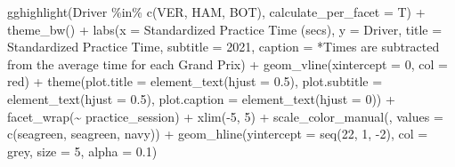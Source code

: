 \documentclass[
]{book}
\newenvironment{Shaded}{\begin{snugshade}}{\end{snugshade}}
\newcommand{\AttributeTok}[1]{\textcolor[rgb]{0.77,0.63,0.00}{#1}}
\newcommand{\DecValTok}[1]{\textcolor[rgb]{0.00,0.00,0.81}{#1}}
\newcommand{\FloatTok}[1]{\textcolor[rgb]{0.00,0.00,0.81}{#1}}
\newcommand{\FunctionTok}[1]{\textcolor[rgb]{0.00,0.00,0.00}{#1}}
\newcommand{\NormalTok}[1]{#1}
\newcommand{\SpecialCharTok}[1]{\textcolor[rgb]{0.00,0.00,0.00}{#1}}
\newcommand{\StringTok}[1]{\textcolor[rgb]{0.31,0.60,0.02}{#1}}
\begin{document}
\begin{Shaded}
\begin{Highlighting}[]
  \FunctionTok{gghighlight}\NormalTok{(Driver }\SpecialCharTok{\%in\%} \FunctionTok{c}\NormalTok{(}\StringTok{\textquotesingle{}VER\textquotesingle{}}\NormalTok{, }\StringTok{\textquotesingle{}HAM\textquotesingle{}}\NormalTok{, }\StringTok{\textquotesingle{}BOT\textquotesingle{}}\NormalTok{), }\AttributeTok{calculate\_per\_facet =}\NormalTok{ T) }\SpecialCharTok{+} 
   \FunctionTok{theme\_bw}\NormalTok{() }\SpecialCharTok{+}
   \FunctionTok{labs}\NormalTok{(}\AttributeTok{x =} \StringTok{\textquotesingle{}Standardized Practice Time (secs)\textquotesingle{}}\NormalTok{,}
        \AttributeTok{y =} \StringTok{\textquotesingle{}Driver\textquotesingle{}}\NormalTok{,}
        \AttributeTok{title =} \StringTok{\textquotesingle{}Standardized Practice Time\textquotesingle{}}\NormalTok{,}
        \AttributeTok{subtitle =} \StringTok{\textquotesingle{}2021\textquotesingle{}}\NormalTok{,}
        \AttributeTok{caption =} \StringTok{\textquotesingle{}*Times are subtracted from the average time for each Grand Prix\textquotesingle{}}\NormalTok{) }\SpecialCharTok{+}
   \FunctionTok{geom\_vline}\NormalTok{(}\AttributeTok{xintercept =} \DecValTok{0}\NormalTok{, }\AttributeTok{col =} \StringTok{\textquotesingle{}red\textquotesingle{}}\NormalTok{) }\SpecialCharTok{+}
   \FunctionTok{theme}\NormalTok{(}\AttributeTok{plot.title =} \FunctionTok{element\_text}\NormalTok{(}\AttributeTok{hjust =} \FloatTok{0.5}\NormalTok{),}
         \AttributeTok{plot.subtitle =} \FunctionTok{element\_text}\NormalTok{(}\AttributeTok{hjust =} \FloatTok{0.5}\NormalTok{),}
         \AttributeTok{plot.caption =} \FunctionTok{element\_text}\NormalTok{(}\AttributeTok{hjust =} \DecValTok{0}\NormalTok{)) }\SpecialCharTok{+}
  \FunctionTok{facet\_wrap}\NormalTok{(}\SpecialCharTok{\textasciitilde{}}\NormalTok{ practice\_session) }\SpecialCharTok{+}
  \FunctionTok{xlim}\NormalTok{(}\SpecialCharTok{{-}}\DecValTok{5}\NormalTok{, }\DecValTok{5}\NormalTok{) }\SpecialCharTok{+}
  \FunctionTok{scale\_color\_manual}\NormalTok{(}\StringTok{\textquotesingle{}\textquotesingle{}}\NormalTok{, }\AttributeTok{values =} \FunctionTok{c}\NormalTok{(}\StringTok{\textquotesingle{}seagreen\textquotesingle{}}\NormalTok{, }\StringTok{\textquotesingle{}seagreen\textquotesingle{}}\NormalTok{, }\StringTok{\textquotesingle{}navy\textquotesingle{}}\NormalTok{)) }\SpecialCharTok{+}
  \FunctionTok{geom\_hline}\NormalTok{(}\AttributeTok{yintercept =} \FunctionTok{seq}\NormalTok{(}\DecValTok{22}\NormalTok{, }\DecValTok{1}\NormalTok{, }\SpecialCharTok{{-}}\DecValTok{2}\NormalTok{), }\AttributeTok{col =} \StringTok{\textquotesingle{}grey\textquotesingle{}}\NormalTok{, }\AttributeTok{size =} \DecValTok{5}\NormalTok{, }\AttributeTok{alpha =}  \FloatTok{0.1}\NormalTok{)}
\end{Highlighting}
\end{Shaded}
\end{document}
